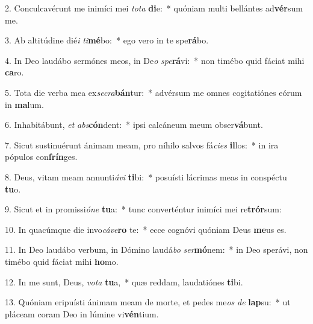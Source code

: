 2. Conculcavérunt me inimíci mei \textit{to}\textit{ta} \textbf{di}e:~*  quóniam multi bellántes ad\textbf{vér}sum me.\

3. Ab altitúdine dié\textit{i} \textit{ti}\textbf{mé}bo:~*  ego vero in te spe\textbf{rá}bo.\

4. In Deo laudábo sermónes meos, in De\textit{o} \textit{spe}\textbf{rá}vi:~*  non timébo quid fáciat mihi \textbf{ca}ro.\

5. Tota die verba mea ex\textit{se}\textit{cra}\textbf{bán}tur:~*  advérsum me omnes cogitatiónes eórum in \textbf{ma}lum.\

6. Inhabitábunt, \textit{et} \textit{abs}\textbf{cón}dent:~*  ipsi calcáneum meum obser\textbf{vá}bunt.\

7. Sicut sustinuérunt ánimam meam, pro níhilo salvos fá\textit{ci}\textit{es} \textbf{il}los:~*  in ira pópulos con\textbf{frín}ges.\

8. Deus, vitam meam annunti\textit{á}\textit{vi} \textbf{ti}bi:~*  posuísti lácrimas meas in conspéctu \textbf{tu}o.\

9. Sicut et in promissi\textit{ó}\textit{ne} \textbf{tu}a:~*  tunc converténtur inimíci mei re\textbf{trór}sum:\

10. In quacúmque die invo\textit{cá}\textit{ve}\textbf{ro} te:~*  ecce cognóvi quóniam Deus \textbf{me}us es.\

11. In Deo laudábo verbum, in Dómino laudá\textit{bo} \textit{ser}\textbf{mó}nem:~*  in Deo sperávi, non timébo quid fáciat mihi \textbf{ho}mo.\

12. In me sunt, Deus, \textit{vo}\textit{ta} \textbf{tu}a,~*  quæ reddam, laudatiónes \textbf{ti}bi.\

13. Quóniam eripuísti ánimam meam de morte, et pedes me\textit{os} \textit{de} \textbf{lap}su:~*  ut pláceam coram Deo in lúmine vi\textbf{vén}tium.\

